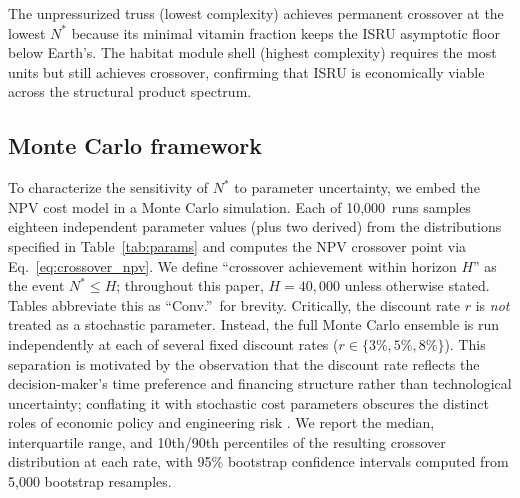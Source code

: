 \documentclass[5p,twocolumn]{elsarticle}
\begin{document}
\begin{table}[htbp]
\centering
\caption{Physical archetype sensitivity. Each archetype represents a distinct structural product class with characteristic vitamin fraction and vitamin component cost. Crossover computed with phased $K$ (5~yr) at $r = 5\%$.}
\label{tab:archetype_fv}
\small
{}
\end{table}

The unpressurized truss (lowest complexity) achieves permanent crossover at the lowest $N^*$ because its minimal vitamin fraction keeps the ISRU asymptotic floor below Earth's. The habitat module shell (highest complexity) requires the most units but still achieves crossover, confirming that ISRU is economically viable across the structural product spectrum.

\subsection{Monte Carlo framework}

To characterize the sensitivity of $N^*$ to parameter uncertainty, we embed the NPV cost model in a Monte Carlo simulation. Each of 10{,}000~runs samples eighteen independent parameter values (plus two derived) from the distributions specified in Table~\ref{tab:params} and computes the NPV crossover point via Eq.~\ref{eq:crossover_npv}. We define ``crossover achievement within horizon $H$'' as the event $N^* \leq H$; throughout this paper, $H = 40{,}000$ unless otherwise stated. Tables abbreviate this as ``Conv.''\ for brevity. Critically, the discount rate $r$ is \emph{not} treated as a stochastic parameter. Instead, the full Monte Carlo ensemble is run independently at each of several fixed discount rates ($r \in \{3\%, 5\%, 8\%\}$). This separation is motivated by the observation that the discount rate reflects the decision-maker's time preference and financing structure rather than technological uncertainty; conflating it with stochastic cost parameters obscures the distinct roles of economic policy and engineering risk \cite{arrow2014}. We report the median, interquartile range, and 10th/90th percentiles of the resulting crossover distribution at each rate, with 95\% bootstrap confidence intervals computed from 5{,}000 bootstrap resamples.
\end{document}
